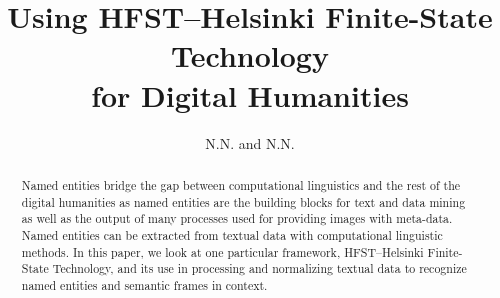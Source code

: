 \documentclass{llncs}
\begin{document}
%
\title{Using HFST--Helsinki Finite-State Technology \\for Digital Humanities}
%
\author{N.N. and N.N.}


\maketitle


\begin{abstract}
Named entities bridge the gap between computational linguistics and the rest of the digital humanities 
as named entities are the building blocks for text and data mining 
as well as the output of many processes used for providing images 
with meta-data. Named entities can be extracted from textual data with computational linguistic methods. 
In this paper, we look at one particular framework, HFST--Helsinki Finite-State Technology, and its
use in processing and normalizing textual data to recognize named entities and semantic frames in context.
\end{abstract}
\end{document}

